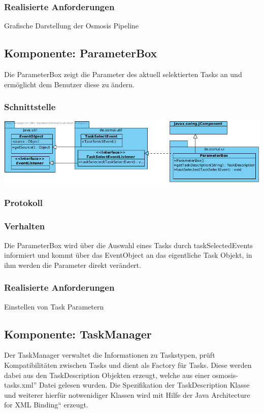 \documentclass[a4paper,12pt]{scrartcl}
\begin{document}
\subsubsection{Realisierte Anforderungen}
Grafische Darstellung der Osmosis Pipeline

\subsection{Komponente: ParameterBox}
Die ParameterBox zeigt die Parameter des aktuell selektierten Tasks an und ermöglicht dem Benutzer diese zu ändern. 
\subsubsection{Schnittstelle}
\begin{center}
\includegraphics[width=17cm]{Schnittstelle_ParameterBox.png}
\end{center}
\subsubsection{Protokoll}
\subsubsection{Verhalten}
Die ParameterBox wird über die Auswahl eines Tasks durch taskSelectedEvents informiert und kommt über das EventObject an das eigentliche Task Objekt, in ihm werden die Parameter direkt verändert.
\subsubsection{Realisierte Anforderungen}
Einstellen von Task Parametern

\subsection{Komponente: TaskManager}
Der TaskManager verwaltet die Informationen zu Taskstypen, prüft Kompatibilitäten zwischen Tasks und dient als Factory für Tasks. Diese werden dabei aus den TaskDescription Objekten erzeugt, welche aus einer \glqq osmosis-tasks.xml'' Datei gelesen wurden. Die Spezifikation der TaskDescription Klasse und weiterer hierfür notwenidiger Klassen wird mit Hilfe
der \glqq Java Architecture for XML Binding`` erzeugt.
\end{document}
